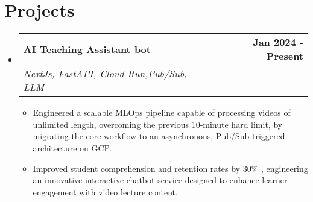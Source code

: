 \documentclass[letterpaper,11pt]{article}
\makeatletter
\newcommand{\resumeItem}[1]{
  \item\small{
    {#1 \vspace{-3pt}}
  }
}
\newcommand{\resumeSubheading}[4]{
  \vspace{-4pt}\item
    \begin{tabular*}{1.0\textwidth}[t]{l@{\extracolsep{\fill}}r}
      \textbf{#1} & \textbf{\small #2} \\
      \textit{\small#3} & \textit{\small #4} \\
    \end{tabular*}\vspace{-10pt}
}
\newcommand{\resumeSubHeadingListStart}{\begin{itemize}[leftmargin=0.0in, label={}]}
\newcommand{\resumeSubHeadingListEnd}{\end{itemize}}
\newcommand{\resumeItemListStart}{\begin{itemize}}
\newcommand{\resumeItemListEnd}{\end{itemize}\vspace{-5pt}}
\makeatother
\begin{document}
\section*{Projects}
\resumeSubHeadingListStart
        \resumeSubheading{AI Teaching Assistant bot}{Jan 2024 - Present}{NextJs, FastAPI, Cloud Run,Pub/Sub, LLM}{}
       \resumeItemListStart
       \resumeItem{Engineered a scalable MLOps pipeline capable of processing videos of unlimited length, overcoming the previous 10-minute hard limit, by migrating the core workflow to an asynchronous, Pub/Sub-triggered architecture on GCP.}
       \resumeItem{Improved student comprehension and retention rates by  30\% , engineering an innovative interactive chatbot service designed to enhance learner engagement with video lecture content.}
        \resumeItemListEnd 
    \resumeSubHeadingListEnd
\vspace{-8pt}
\end{document}
